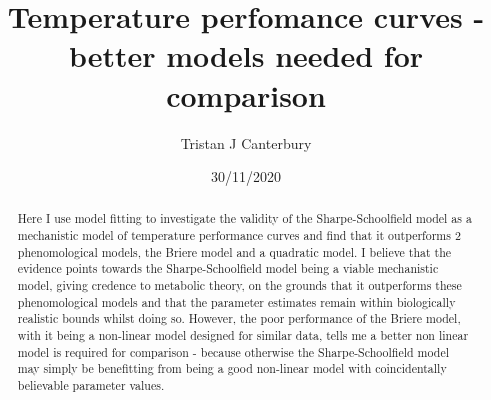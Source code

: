 \documentclass[12pt]{article}
\title{Temperature perfomance curves - better models needed for comparison}
\author{Tristan J Canterbury}
\date{30/11/2020}
\begin{document}
  \maketitle

  \begin{abstract}
  Here I use model fitting to investigate the validity of the Sharpe-Schoolfield model as a mechanistic model of temperature performance curves 
  and find that it outperforms 2 phenomological models, the Briere model and a quadratic model.
  I believe that the evidence points towards the Sharpe-Schoolfield model being a viable mechanistic model, giving credence
  to metabolic theory, on the grounds that it outperforms 
  these phenomological models and that the parameter estimates remain within biologically realistic bounds whilst doing so. 
  However, the poor performance of the Briere model, with it being a non-linear 
  model designed for similar data, tells me a better non linear model is required for comparison - because otherwise 
  the Sharpe-Schoolfield model may simply be benefitting from being a good non-linear model with coincidentally believable 
  parameter values.  

  \end{abstract}
\end{document}
